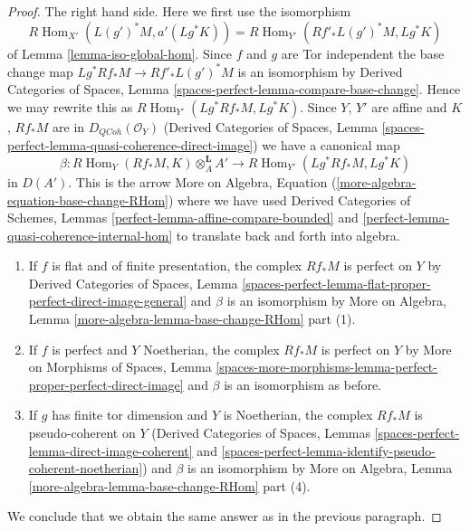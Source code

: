 \documentclass{stacks-project}
\theoremstyle{plain}
\theoremstyle{definition}
\theoremstyle{remark}
\numberwithin{equation}{subsection}
\def\Hom{\mathop{\mathrm{Hom}}\nolimits}
\def\QCoh{\mathit{QCoh}}
\begin{document}
\begin{proof}
\medskip\noindent
The right hand side. Here we first use the isomorphism
$$
R\Hom_{X'}(L(g')^*M, a'(Lg^*K)) = R\Hom_{Y'}(Rf'_*L(g')^*M, Lg^*K)
$$
of Lemma \ref{lemma-iso-global-hom}. Since $f$ and $g$ are
Tor independent the base change
map $Lg^*Rf_*M \to Rf'_*L(g')^*M$ is an isomorphism by
Derived Categories of Spaces, Lemma
\ref{spaces-perfect-lemma-compare-base-change}.
Hence we may rewrite this as $R\Hom_{Y'}(Lg^*Rf_*M, Lg^*K)$.
Since $Y$, $Y'$ are affine and $K$, $Rf_*M$ are in $D_\QCoh(\mathcal{O}_Y)$
(Derived Categories of Spaces, Lemma
\ref{spaces-perfect-lemma-quasi-coherence-direct-image})
we have a canonical map
$$
\beta :
R\Hom_Y(Rf_*M, K) \otimes^\mathbf{L}_A A'
\longrightarrow
R\Hom_{Y'}(Lg^*Rf_*M, Lg^*K)
$$
in $D(A')$. This is the arrow
More on Algebra, Equation (\ref{more-algebra-equation-base-change-RHom})
where we have used Derived Categories of Schemes, Lemmas
\ref{perfect-lemma-affine-compare-bounded} and
\ref{perfect-lemma-quasi-coherence-internal-hom}
to translate back and forth into algebra.
\begin{enumerate}
\item If $f$ is flat and of finite presentation, the complex $Rf_*M$
is perfect on $Y$ by Derived Categories of Spaces, Lemma
\ref{spaces-perfect-lemma-flat-proper-perfect-direct-image-general}
and $\beta$ is an isomorphism by
More on Algebra, Lemma \ref{more-algebra-lemma-base-change-RHom} part (1).
\item If $f$ is perfect and $Y$ Noetherian, the complex $Rf_*M$
is perfect on $Y$ by More on Morphisms of Spaces, Lemma
\ref{spaces-more-morphisms-lemma-perfect-proper-perfect-direct-image}
and $\beta$ is an isomorphism as before.
\item If $g$ has finite tor dimension and $Y$ is Noetherian,
the complex $Rf_*M$ is pseudo-coherent on $Y$
(Derived Categories of Spaces, Lemmas
\ref{spaces-perfect-lemma-direct-image-coherent} and
\ref{spaces-perfect-lemma-identify-pseudo-coherent-noetherian})
and $\beta$ is an isomorphism by
More on Algebra, Lemma \ref{more-algebra-lemma-base-change-RHom} part (4).
\end{enumerate}
We conclude that we obtain the same answer as in the previous paragraph.


\end{proof}
\end{document}

